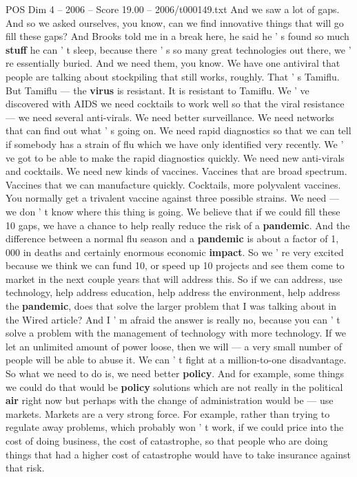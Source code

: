\begin{textsample}{POS Dim 4 – 2006 – Score 19.00 – 2006/t000149.txt}
And we saw a lot of gaps.
And so we asked ourselves, you know, can we find innovative things that will go fill these gaps?
And Brooks told me in a break here, he said he ' s found so much \textbf{stuff} he can ' t sleep, because there ' s so many great technologies out there, we ' re essentially buried.
And we need them, you know.
We have one antiviral that people are talking about stockpiling that still works, roughly.
That ' s Tamiflu.
But Tamiflu — the \textbf{virus} is resistant.
It is resistant to Tamiflu.
We ' ve discovered with AIDS we need cocktails to work well so that the viral resistance — we need several anti-virals.
We need better surveillance.
We need networks that can find out what ' s going on.
We need rapid diagnostics so that we can tell if somebody has a strain of flu which we have only identified very recently.
We ' ve got to be able to make the rapid diagnostics quickly.
We need new anti-virals and cocktails.
We need new kinds of vaccines.
Vaccines that are broad spectrum.
Vaccines that we can manufacture quickly.
Cocktails, more polyvalent vaccines.
You normally get a trivalent vaccine against three possible strains.
We need — we don ' t know where this thing is going.
We believe that if we could fill these 10 gaps, we have a chance to help really reduce the risk of a \textbf{pandemic}.
And the difference between a normal flu season and a \textbf{pandemic} is about a factor of 1, 000 in deaths and certainly enormous economic \textbf{impact}.
So we ' re very excited because we think we can fund 10, or speed up 10 projects and see them come to market in the next couple years that will address this.
So if we can address, use technology, help address education, help address the environment, help address the \textbf{pandemic}, does that solve the larger problem that I was talking about in the Wired article?
And I ' m afraid the answer is really no, because you can ' t solve a problem with the management of technology with more technology.
If we let an unlimited amount of power loose, then we will — a very small number of people will be able to abuse it.
We can ' t fight at a million-to-one disadvantage.
So what we need to do is, we need better \textbf{policy}.
And for example, some things we could do that would be \textbf{policy} solutions which are not really in the political \textbf{air} right now but perhaps with the change of administration would be — use markets.
Markets are a very strong force.
For example, rather than trying to regulate away problems, which probably won ' t work, if we could price into the cost of doing business, the cost of catastrophe, so that people who are doing things that had a higher cost of catastrophe would have to take insurance against that risk.

\end{textsample}
